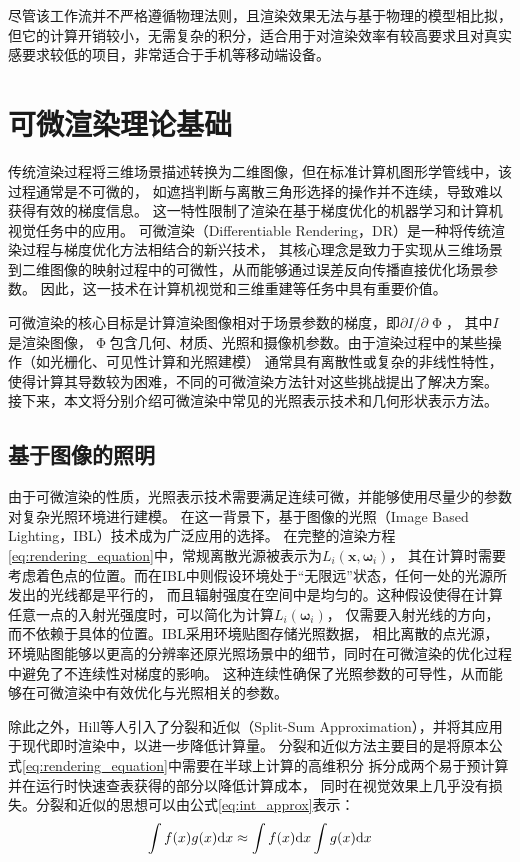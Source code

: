 尽管该工作流并不严格遵循物理法则，且渲染效果无法与基于物理的模型相比拟，但它的计算开销较小，无需复杂的积分，适合用于对渲染效率有较高要求且对真实感要求较低的项目，非常适合于手机等移动端设备。

\section{可微渲染理论基础}
传统渲染过程将三维场景描述转换为二维图像，但在标准计算机图形学管线中，该过程通常是不可微的，
如遮挡判断与离散三角形选择的操作并不连续，导致难以获得有效的梯度信息。
这一特性限制了渲染在基于梯度优化的机器学习和计算机视觉任务中的应用。
可微渲染（Differentiable Rendering，DR）是一种将传统渲染过程与梯度优化方法相结合的新兴技术，
其核心理念是致力于实现从三维场景到二维图像的映射过程中的可微性，从而能够通过误差反向传播直接优化场景参数。
因此，这一技术在计算机视觉和三维重建等任务中具有重要价值。

可微渲染的核心目标是计算渲染图像相对于场景参数的梯度，即${\partial I}/{\partial \upPhi}$，
其中$I$是渲染图像，$\upPhi$包含几何、材质、光照和摄像机参数。由于渲染过程中的某些操作（如光栅化、可见性计算和光照建模）
通常具有离散性或复杂的非线性特性，使得计算其导数较为困难，不同的可微渲染方法针对这些挑战提出了解决方案。
接下来，本文将分别介绍可微渲染中常见的光照表示技术和几何形状表示方法。

\subsection{基于图像的照明} \label{sec:IBL}
由于可微渲染的性质，光照表示技术需要满足连续可微，并能够使用尽量少的参数对复杂光照环境进行建模。
在这一背景下，基于图像的光照（Image Based Lighting，IBL）技术成为广泛应用的选择。
在完整的渲染方程\eqref{eq:rendering_equation}中，常规离散光源被表示为$L_i(\boldsymbol{x},{\boldsymbol{\omega}}_i)$，
其在计算时需要考虑着色点的位置。而在IBL中则假设环境处于“无限远”状态，任何一处的光源所发出的光线都是平行的，
而且辐射强度在空间中是均匀的。这种假设使得在计算任意一点的入射光强度时，可以简化为计算$L_i({\boldsymbol{\omega}}_i)$，
仅需要入射光线的方向，而不依赖于具体的位置。IBL采用环境贴图存储光照数据，
相比离散的点光源，环境贴图能够以更高的分辨率还原光照场景中的细节，同时在可微渲染的优化过程中避免了不连续性对梯度的影响。
这种连续性确保了光照参数的可导性，从而能够在可微渲染中有效优化与光照相关的参数。

除此之外，Hill等人\cite{Hill_2014}引入了分裂和近似（Split-Sum Approximation），并将其应用于现代即时渲染中，以进一步降低计算量。
分裂和近似方法主要目的是将原本公式\eqref{eq:rendering_equation}中需要在半球上计算的高维积分
拆分成两个易于预计算并在运行时快速查表获得的部分以降低计算成本，
同时在视觉效果上几乎没有损失。分裂和近似的思想可以由公式\eqref{eq:int_approx}表示：
\begin{equation}
  \int f(x)g(x){\rm{d}}x\approx \int{f(x){\rm{d}}x} \int{g(x){\rm{d}}x}
  \label{eq:int_approx}
\end{equation}

